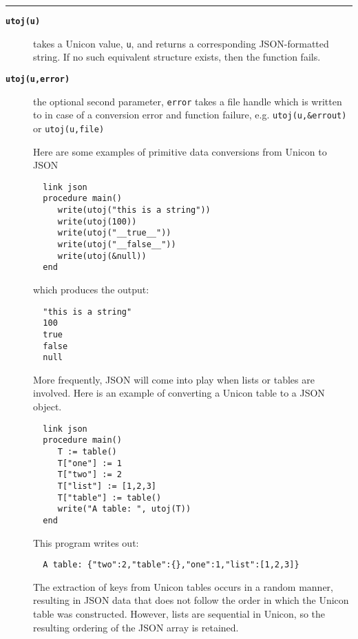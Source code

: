 \documentclass[letterpaper,12pt]{article}
\begin{document}
\noindent\rule{\textwidth}{1pt}
\begin{description}

\item[{\tt\bf utoj(u)}] takes a Unicon value, {\tt u}, and returns a 
  corresponding JSON-formatted string. If no such equivalent structure exists,
  then the function fails. 

\item[{\tt\bf utoj(u,error)}] the optional second parameter, {\tt error} 
  takes a file handle which is written to in case of a conversion error and
  function failure, e.g. {\tt utoj(u,\&errout)} or {\tt utoj(u,file)}

\vspace{1em}

Here are some examples of primitive data conversions from Unicon to JSON

  \begin{verbatim}
  link json
  procedure main()
     write(utoj("this is a string"))
     write(utoj(100))
     write(utoj("__true__"))
     write(utoj("__false__"))
     write(utoj(&null))
  end
  \end{verbatim}

which produces the output:

  \begin{verbatim}
  "this is a string"
  100
  true
  false
  null 
  \end{verbatim}

More frequently, JSON will come into play when lists or tables are
involved. Here is an example of converting a Unicon table to a JSON object.

  \begin{verbatim}
  link json
  procedure main()
     T := table()
     T["one"] := 1
     T["two"] := 2
     T["list"] := [1,2,3]
     T["table"] := table()
     write("A table: ", utoj(T))
  end
  \end{verbatim}

This program writes out:

  \begin{verbatim}
  A table: {"two":2,"table":{},"one":1,"list":[1,2,3]}
  \end{verbatim}

The extraction of keys from Unicon tables occurs in a random manner,
resulting in JSON data that does not follow the order in which the Unicon
table was constructed. However, lists are sequential in Unicon, so the
resulting ordering of the JSON array is retained. 


\end{description}
\end{document}
